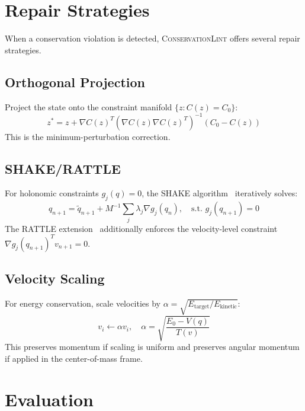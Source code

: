 \documentclass[11pt,a4paper]{article}
\begin{document}
\section{Repair Strategies}
\label{sec:repair}

When a conservation violation is detected, \textsc{ConservationLint} offers several repair strategies.

\subsection{Orthogonal Projection}

Project the state onto the constraint manifold $\{z : C(z) = C_0\}$:
\begin{equation}
    z^* = z + \nabla C(z)^T (\nabla C(z) \nabla C(z)^T)^{-1} (C_0 - C(z))
\end{equation}
This is the minimum-perturbation correction.

\subsection{SHAKE/RATTLE}

For holonomic constraints $g_j(q) = 0$, the SHAKE algorithm~\citep{ryckaert1977} iteratively solves:
\begin{equation}
    q_{n+1} = \tilde{q}_{n+1} + M^{-1} \sum_j \lambda_j \nabla g_j(q_n), \quad \text{s.t. } g_j(q_{n+1}) = 0
\end{equation}
The RATTLE extension~\citep{andersen1983} additionally enforces the velocity-level constraint $\nabla g_j(q_{n+1})^T v_{n+1} = 0$.

\subsection{Velocity Scaling}

For energy conservation, scale velocities by $\alpha = \sqrt{E_{\text{target}}/E_{\text{kinetic}}}$:
\begin{equation}
    v_i \leftarrow \alpha v_i, \quad \alpha = \sqrt{\frac{E_0 - V(q)}{T(v)}}
\end{equation}
This preserves momentum if scaling is uniform and preserves angular momentum if applied in the center-of-mass frame.

\section{Evaluation}
\label{sec:evaluation}
\end{document}
